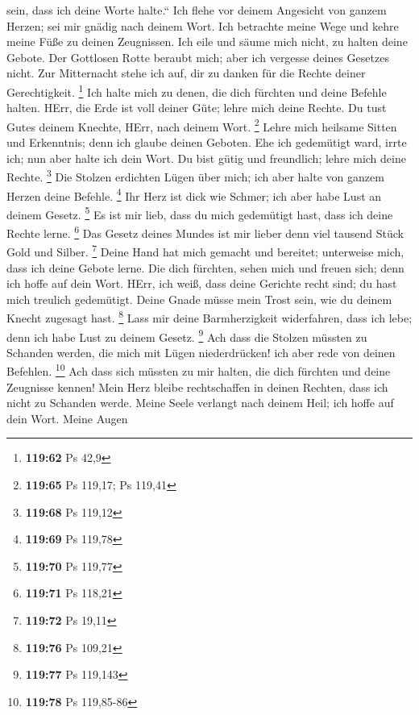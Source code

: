 sein, dass ich deine Worte halte.``  Ich flehe vor deinem
Angesicht von ganzem Herzen; sei mir gnädig nach deinem Wort.
 Ich betrachte meine Wege und kehre meine Füße zu deinen
Zeugnissen.  Ich eile und säume mich nicht, zu halten deine
Gebote.  Der Gottlosen Rotte beraubt mich; aber ich
vergesse deines Gesetzes nicht.  Zur Mitternacht stehe ich
auf, dir zu danken für die Rechte deiner Gerechtigkeit. \footnote{\textbf{119:62}
  Ps 42,9}  Ich halte mich zu denen, die dich fürchten und
deine Befehle halten.  HErr, die Erde ist voll deiner Güte;
lehre mich deine Rechte.  Du tust Gutes deinem Knechte,
HErr, nach deinem Wort. \footnote{\textbf{119:65} Ps 119,17; Ps 119,41}
 Lehre mich heilsame Sitten und Erkenntnis; denn ich glaube
deinen Geboten.  Ehe ich gedemütigt ward, irrte ich; nun
aber halte ich dein Wort.  Du bist gütig und freundlich;
lehre mich deine Rechte. \footnote{\textbf{119:68} Ps 119,12}
 Die Stolzen erdichten Lügen über mich; ich aber halte von
ganzem Herzen deine Befehle. \footnote{\textbf{119:69} Ps 119,78}
 Ihr Herz ist dick wie Schmer; ich aber habe Lust an deinem
Gesetz. \footnote{\textbf{119:70} Ps 119,77}  Es ist mir
lieb, dass du mich gedemütigt hast, dass ich deine Rechte lerne.
\footnote{\textbf{119:71} Ps 118,21}  Das Gesetz deines
Mundes ist mir lieber denn viel tausend Stück Gold und Silber.
\footnote{\textbf{119:72} Ps 19,11}  Deine Hand hat mich
gemacht und bereitet; unterweise mich, dass ich deine Gebote lerne.
 Die dich fürchten, sehen mich und freuen sich; denn ich
hoffe auf dein Wort.  HErr, ich weiß, dass deine Gerichte
recht sind; du hast mich treulich gedemütigt.  Deine Gnade
müsse mein Trost sein, wie du deinem Knecht zugesagt hast. \footnote{\textbf{119:76}
  Ps 109,21}  Lass mir deine Barmherzigkeit widerfahren,
dass ich lebe; denn ich habe Lust zu deinem Gesetz. \footnote{\textbf{119:77}
  Ps 119,143}  Ach dass die Stolzen müssten zu Schanden
werden, die mich mit Lügen niederdrücken! ich aber rede von deinen
Befehlen. \footnote{\textbf{119:78} Ps 119,85-86}  Ach dass
sich müssten zu mir halten, die dich fürchten und deine Zeugnisse
kennen!  Mein Herz bleibe rechtschaffen in deinen Rechten,
dass ich nicht zu Schanden werde.  Meine Seele verlangt
nach deinem Heil; ich hoffe auf dein Wort.  Meine Augen
